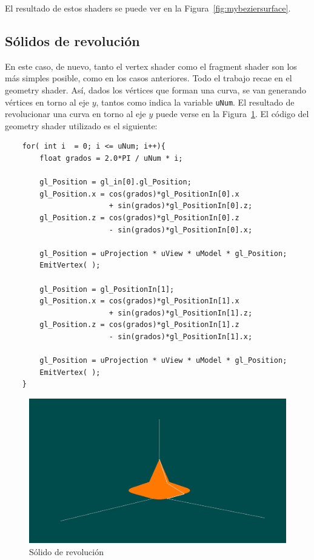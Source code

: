 El resultado de estos shaders se puede ver en la
Figura~\ref{fig:mybeziersurface}.

\subsection{Sólidos de revolución}
\label{makereference5.5.4}

En este caso, de nuevo, tanto el vertex shader como el fragment shader son los
más simples posible, como en los casos anteriores. Todo el trabajo recae en el
geometry shader. Así, dados los vértices que forman una curva, se van generando
vértices en torno al eje $y$, tantos como indica la variable \verb|uNum|. El
resultado de revolucionar una curva en torno al eje $y$ puede verse en la
Figura~\ref{fig:myrevolution}. El código del geometry shader utilizado es el
siguiente:

\begin{verbatim}
    for( int i  = 0; i <= uNum; i++){
        float grados = 2.0*PI / uNum * i;
        
        gl_Position = gl_in[0].gl_Position;
        gl_Position.x = cos(grados)*gl_PositionIn[0].x 
		                + sin(grados)*gl_PositionIn[0].z;
        gl_Position.z = cos(grados)*gl_PositionIn[0].z 
		                - sin(grados)*gl_PositionIn[0].x;

        gl_Position = uProjection * uView * uModel * gl_Position;
        EmitVertex( );
        
        gl_Position = gl_PositionIn[1];
        gl_Position.x = cos(grados)*gl_PositionIn[1].x 
		                + sin(grados)*gl_PositionIn[1].z;
        gl_Position.z = cos(grados)*gl_PositionIn[1].z 
		                - sin(grados)*gl_PositionIn[1].x;

        gl_Position = uProjection * uView * uModel * gl_Position;
        EmitVertex( );
    }
\end{verbatim}

\begin{figure}[ht]
	\centering		
	\includegraphics[width=\textwidth]{figures/myrevolution.png}
	\caption{Sólido de revolución}
	\label{fig:myrevolution}
\end{figure}

